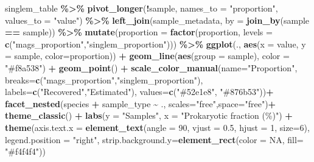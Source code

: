 \documentclass[
]{book}
\newenvironment{Shaded}{\begin{snugshade}}{\end{snugshade}}
\newcommand{\AttributeTok}[1]{\textcolor[rgb]{0.13,0.29,0.53}{#1}}
\newcommand{\ConstantTok}[1]{\textcolor[rgb]{0.56,0.35,0.01}{#1}}
\newcommand{\DecValTok}[1]{\textcolor[rgb]{0.00,0.00,0.81}{#1}}
\newcommand{\FloatTok}[1]{\textcolor[rgb]{0.00,0.00,0.81}{#1}}
\newcommand{\FunctionTok}[1]{\textcolor[rgb]{0.13,0.29,0.53}{\textbf{#1}}}
\newcommand{\NormalTok}[1]{#1}
\newcommand{\SpecialCharTok}[1]{\textcolor[rgb]{0.81,0.36,0.00}{\textbf{#1}}}
\newcommand{\StringTok}[1]{\textcolor[rgb]{0.31,0.60,0.02}{#1}}
\begin{document}
\begin{Shaded}
\begin{Highlighting}[]
\NormalTok{singlem\_table }\SpecialCharTok{\%\textgreater{}\%}
    \FunctionTok{pivot\_longer}\NormalTok{(}\SpecialCharTok{!}\NormalTok{sample, }\AttributeTok{names\_to =} \StringTok{"proportion"}\NormalTok{, }\AttributeTok{values\_to =} \StringTok{"value"}\NormalTok{) }\SpecialCharTok{\%\textgreater{}\%}
    \FunctionTok{left\_join}\NormalTok{(sample\_metadata, }\AttributeTok{by =} \FunctionTok{join\_by}\NormalTok{(sample }\SpecialCharTok{==}\NormalTok{ sample))  }\SpecialCharTok{\%\textgreater{}\%}
    \FunctionTok{mutate}\NormalTok{(}\AttributeTok{proportion =} \FunctionTok{factor}\NormalTok{(proportion, }\AttributeTok{levels =} \FunctionTok{c}\NormalTok{(}\StringTok{"mags\_proportion"}\NormalTok{,}\StringTok{"singlem\_proportion"}\NormalTok{))) }\SpecialCharTok{\%\textgreater{}\%}
    \FunctionTok{ggplot}\NormalTok{(., }\FunctionTok{aes}\NormalTok{(}\AttributeTok{x =}\NormalTok{ value, }\AttributeTok{y =}\NormalTok{ sample, }\AttributeTok{color=}\NormalTok{proportion)) }\SpecialCharTok{+}
            \FunctionTok{geom\_line}\NormalTok{(}\FunctionTok{aes}\NormalTok{(}\AttributeTok{group =}\NormalTok{ sample), }\AttributeTok{color =} \StringTok{"\#f8a538"}\NormalTok{) }\SpecialCharTok{+}
            \FunctionTok{geom\_point}\NormalTok{() }\SpecialCharTok{+}
      \FunctionTok{scale\_color\_manual}\NormalTok{(}\AttributeTok{name=}\StringTok{"Proportion"}\NormalTok{,}
                    \AttributeTok{breaks=}\FunctionTok{c}\NormalTok{(}\StringTok{"mags\_proportion"}\NormalTok{,}\StringTok{"singlem\_proportion"}\NormalTok{),}
                    \AttributeTok{labels=}\FunctionTok{c}\NormalTok{(}\StringTok{"Recovered"}\NormalTok{,}\StringTok{"Estimated"}\NormalTok{),}
                    \AttributeTok{values=}\FunctionTok{c}\NormalTok{(}\StringTok{"\#52e1e8"}\NormalTok{, }\StringTok{"\#876b53"}\NormalTok{))}\SpecialCharTok{+}
      \FunctionTok{facet\_nested}\NormalTok{(species }\SpecialCharTok{+}\NormalTok{ sample\_type }\SpecialCharTok{\textasciitilde{}}\NormalTok{ ., }\AttributeTok{scales=}\StringTok{"free"}\NormalTok{,}\AttributeTok{space=}\StringTok{"free"}\NormalTok{)}\SpecialCharTok{+}
            \FunctionTok{theme\_classic}\NormalTok{() }\SpecialCharTok{+}
            \FunctionTok{labs}\NormalTok{(}\AttributeTok{y =} \StringTok{"Samples"}\NormalTok{, }\AttributeTok{x =} \StringTok{"Prokaryotic fraction (\%)"}\NormalTok{) }\SpecialCharTok{+}
        \FunctionTok{theme}\NormalTok{(}\AttributeTok{axis.text.x =} \FunctionTok{element\_text}\NormalTok{(}\AttributeTok{angle =} \DecValTok{90}\NormalTok{, }\AttributeTok{vjust =} \FloatTok{0.5}\NormalTok{, }\AttributeTok{hjust =} \DecValTok{1}\NormalTok{, }\AttributeTok{size=}\DecValTok{6}\NormalTok{),}
              \AttributeTok{legend.position =} \StringTok{"right"}\NormalTok{,}
              \AttributeTok{strip.background.y=}\FunctionTok{element\_rect}\NormalTok{(}\AttributeTok{color =} \ConstantTok{NA}\NormalTok{, }\AttributeTok{fill=} \StringTok{"\#f4f4f4"}\NormalTok{))}
\end{Highlighting}
\end{Shaded}
\end{document}
